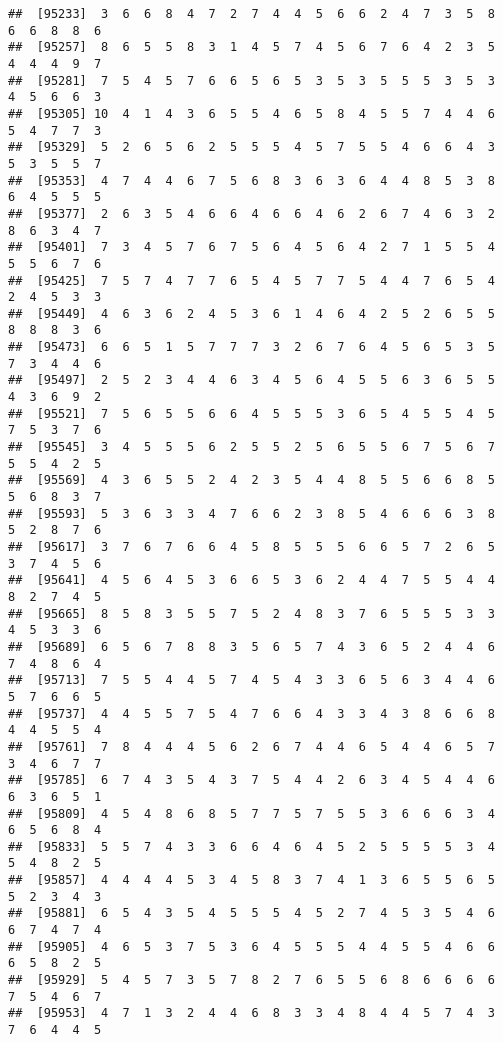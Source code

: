 \documentclass[
]{book}
\begin{document}
\begin{verbatim}
##  [95233]  3  6  6  8  4  7  2  7  4  4  5  6  6  2  4  7  3  5  8  6  6  8  8  6
##  [95257]  8  6  5  5  8  3  1  4  5  7  4  5  6  7  6  4  2  3  5  4  4  4  9  7
##  [95281]  7  5  4  5  7  6  6  5  6  5  3  5  3  5  5  5  3  5  3  4  5  6  6  3
##  [95305] 10  4  1  4  3  6  5  5  4  6  5  8  4  5  5  7  4  4  6  5  4  7  7  3
##  [95329]  5  2  6  5  6  2  5  5  5  4  5  7  5  5  4  6  6  4  3  5  3  5  5  7
##  [95353]  4  7  4  4  6  7  5  6  8  3  6  3  6  4  4  8  5  3  8  6  4  5  5  5
##  [95377]  2  6  3  5  4  6  6  4  6  6  4  6  2  6  7  4  6  3  2  8  6  3  4  7
##  [95401]  7  3  4  5  7  6  7  5  6  4  5  6  4  2  7  1  5  5  4  5  5  6  7  6
##  [95425]  7  5  7  4  7  7  6  5  4  5  7  7  5  4  4  7  6  5  4  2  4  5  3  3
##  [95449]  4  6  3  6  2  4  5  3  6  1  4  6  4  2  5  2  6  5  5  8  8  8  3  6
##  [95473]  6  6  5  1  5  7  7  7  3  2  6  7  6  4  5  6  5  3  5  7  3  4  4  6
##  [95497]  2  5  2  3  4  4  6  3  4  5  6  4  5  5  6  3  6  5  5  4  3  6  9  2
##  [95521]  7  5  6  5  5  6  6  4  5  5  5  3  6  5  4  5  5  4  5  7  5  3  7  6
##  [95545]  3  4  5  5  5  6  2  5  5  2  5  6  5  5  6  7  5  6  7  5  5  4  2  5
##  [95569]  4  3  6  5  5  2  4  2  3  5  4  4  8  5  5  6  6  8  5  5  6  8  3  7
##  [95593]  5  3  6  3  3  4  7  6  6  2  3  8  5  4  6  6  6  3  8  5  2  8  7  6
##  [95617]  3  7  6  7  6  6  4  5  8  5  5  5  6  6  5  7  2  6  5  3  7  4  5  6
##  [95641]  4  5  6  4  5  3  6  6  5  3  6  2  4  4  7  5  5  4  4  8  2  7  4  5
##  [95665]  8  5  8  3  5  5  7  5  2  4  8  3  7  6  5  5  5  3  3  4  5  3  3  6
##  [95689]  6  5  6  7  8  8  3  5  6  5  7  4  3  6  5  2  4  4  6  7  4  8  6  4
##  [95713]  7  5  5  4  4  5  7  4  5  4  3  3  6  5  6  3  4  4  6  5  7  6  6  5
##  [95737]  4  4  5  5  7  5  4  7  6  6  4  3  3  4  3  8  6  6  8  4  4  5  5  4
##  [95761]  7  8  4  4  4  5  6  2  6  7  4  4  6  5  4  4  6  5  7  3  4  6  7  7
##  [95785]  6  7  4  3  5  4  3  7  5  4  4  2  6  3  4  5  4  4  6  6  3  6  5  1
##  [95809]  4  5  4  8  6  8  5  7  7  5  7  5  5  3  6  6  6  3  4  6  5  6  8  4
##  [95833]  5  5  7  4  3  3  6  6  4  6  4  5  2  5  5  5  5  3  4  5  4  8  2  5
##  [95857]  4  4  4  4  5  3  4  5  8  3  7  4  1  3  6  5  5  6  5  5  2  3  4  3
##  [95881]  6  5  4  3  5  4  5  5  5  4  5  2  7  4  5  3  5  4  6  6  7  4  7  4
##  [95905]  4  6  5  3  7  5  3  6  4  5  5  5  4  4  5  5  4  6  6  6  5  8  2  5
##  [95929]  5  4  5  7  3  5  7  8  2  7  6  5  5  6  8  6  6  6  6  7  5  4  6  7
##  [95953]  4  7  1  3  2  4  4  6  8  3  3  4  8  4  4  5  7  4  3  7  6  4  4  5

\end{verbatim}
\end{document}
